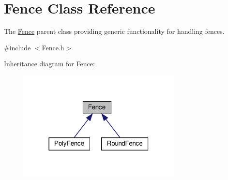\hypertarget{class_fence}{}\section{Fence Class Reference}
\label{class_fence}


The \hyperlink{class_fence}{Fence} parent class providing generic functionality for handling fences.  




{\ttfamily \#include $<$Fence.\+h$>$}



Inheritance diagram for Fence\+:\nopagebreak
\begin{figure}[H]
\begin{center}
\leavevmode
\includegraphics[width=234pt]{dc/d62/class_fence__inherit__graph}
\end{center}
\end{figure}
